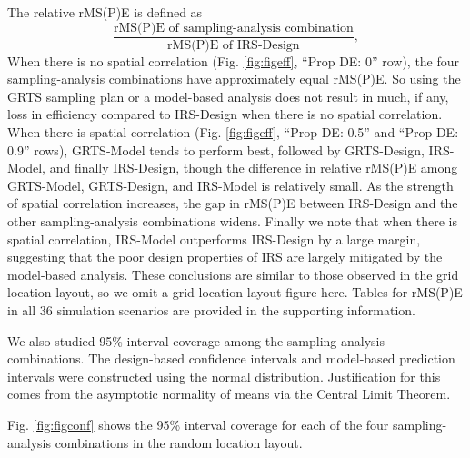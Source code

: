 \documentclass[]{elsarticle} %
\begin{document}
The relative rMS(P)E is defined as \begin{equation*}
\frac{\text{rMS(P)E of sampling-analysis combination}}{\text{rMS(P)E of IRS-Design}},
\end{equation*} When there is no spatial correlation (Fig.
\ref{fig:figeff}, ``Prop DE: 0'' row), the four sampling-analysis
combinations have approximately equal rMS(P)E. So using the GRTS
sampling plan or a model-based analysis does not result in much, if any,
loss in efficiency compared to IRS-Design when there is no spatial
correlation. When there is spatial correlation (Fig. \ref{fig:figeff},
``Prop DE: 0.5'' and ``Prop DE: 0.9'' rows), GRTS-Model tends to perform
best, followed by GRTS-Design, IRS-Model, and finally IRS-Design, though
the difference in relative rMS(P)E among GRTS-Model, GRTS-Design, and
IRS-Model is relatively small. As the strength of spatial correlation
increases, the gap in rMS(P)E between IRS-Design and the other
sampling-analysis combinations widens. Finally we note that when there
is spatial correlation, IRS-Model outperforms IRS-Design by a large
margin, suggesting that the poor design properties of IRS are largely
mitigated by the model-based analysis. These conclusions are similar to
those observed in the grid location layout, so we omit a grid location
layout figure here. Tables for rMS(P)E in all 36 simulation scenarios
are provided in the supporting information.

We also studied 95\% interval coverage among the sampling-analysis
combinations. The design-based confidence intervals and model-based
prediction intervals were constructed using the normal distribution.
Justification for this comes from the asymptotic normality of means via
the Central Limit Theorem.

Fig. \ref{fig:figconf} shows the 95\% interval coverage for each of the
four sampling-analysis combinations in the random location layout.
\end{document}

